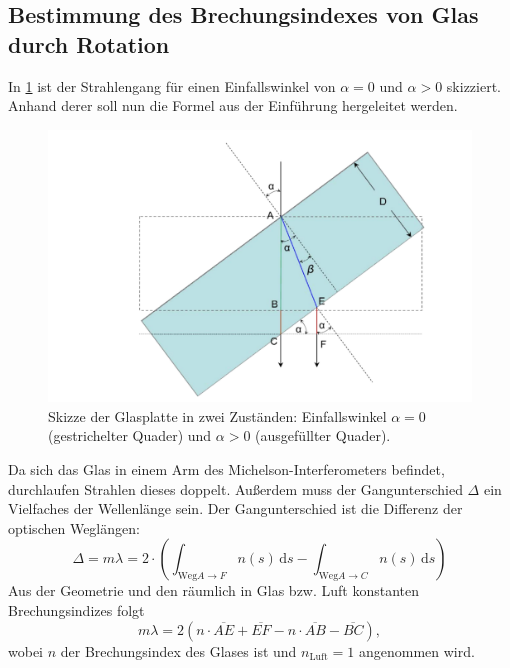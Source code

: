 \documentclass[
	a4paper,
	12pt,
	pagesize,
	ngerman
]{scrartcl}
\begin{document}
	\subsection{Bestimmung des Brechungsindexes von Glas durch Rotation}
	In \cref{fig_glass_rotation} ist der Strahlengang für einen Einfallswinkel von $\alpha=0$ und $\alpha>0$ skizziert.
	Anhand derer soll nun die Formel aus der Einführung hergeleitet werden. %
	\begin{figure}[H]
		\includegraphics[width=1.0\textwidth]{images/Formula}
		\centering
		\caption{Skizze der Glasplatte in zwei Zuständen: Einfallswinkel $\alpha= 0$ (gestrichelter Quader) und $\alpha>0$ (ausgefüllter Quader).\cite{GlasFormula}} %
		\label{fig_glass_rotation}
		\centering
	\end{figure}

	Da sich das Glas in einem Arm des Michelson-Interferometers befindet, durchlaufen Strahlen dieses doppelt.
	Außerdem muss der Gangunterschied $\Delta$ ein Vielfaches der Wellenlänge sein. Der Gangunterschied ist die Differenz der optischen Weglängen:
	\begin{equation}
		\Delta = m\lambda = 2 \cdot \left(\int_{\text{Weg} A \rightarrow F} \! n(s) \, \mathrm{d}s - \int_{\text{Weg} A \rightarrow C} \! n(s) \, \mathrm{d}s \right)
	\end{equation}
	Aus der Geometrie und den räumlich in Glas bzw. Luft konstanten Brechungsindizes folgt
	\begin{equation}
		m\lambda = 2(n\cdot \overline{AE} + \overline{EF} - n \cdot \overline{AB} - \overline{BC}),
		\label{eq_glas_2}
	\end{equation}
	wobei $n$ der Brechungsindex des Glases ist und $n_\text{Luft}=1$ angenommen wird.
\end{document}
